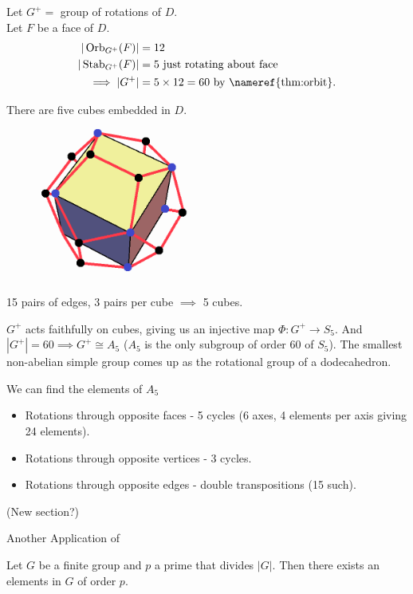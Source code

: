 Let $G^+ =$ group of rotations of $D$. \\
Let $F$ be a face of $D$.
\begin{align*}
    | \operatorname{Orb}_{G^+}(F)| &= 12 \\
    | \operatorname{Stab}_{G^+}(F) | &= 5 \text{ just rotating about face} \\
    \implies |G^+| &= 5 \times 12 = 60 \text{ by \nameref{thm:orbit}.}
\end{align*} 

There are five cubes embedded in $D$.

\begin{figure}
    \centering
    \includegraphics[height=5cm]{figures/07-cube-dodecahedron}
\end{figure} 

15 pairs of edges, 3 pairs per cube $\implies$ 5 cubes.

$G^+$ acts faithfully on cubes, giving us an injective map $\Phi : G^+ \to S_5$.
And $|G^+| = 60 \implies G^+ \cong A_5$ ($A_5$ is the only subgroup of order 60 of $S_5$).
The smallest non-abelian simple group comes up as the rotational group of a dodecahedron.

We can find the elements of $A_5$
\begin{itemize}
    \item Rotations through opposite faces - 5 cycles (6 axes, 4 elements per axis giving 24 elements).
    \item Rotations through opposite vertices - 3 cycles.
    \item Rotations through opposite edges - double transpositions (15 such).
\end{itemize} 

(New section?)

Another Application of 

\begin{theorem} \label{thm:8}
    Let $G$ be a finite group and $p$ a prime that divides $|G|$.
    Then there exists an elements in $G$ of order $p$.
\end{theorem} 

